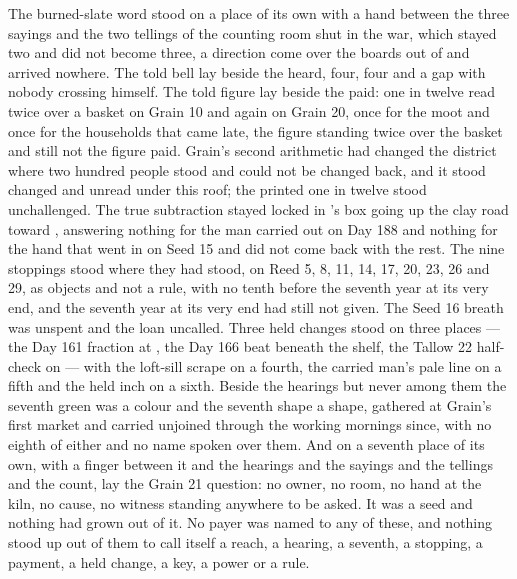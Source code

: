 The burned-slate word stood on a place of its own with a hand between the three sayings and the two tellings of the counting room shut in the war, which stayed two and did not become three, a direction come over the boards out of  and arrived nowhere. The told bell lay beside the heard, four, four and a gap with nobody crossing himself. The told figure lay beside the paid: one in twelve read twice over a basket on Grain 10 and again on Grain 20, once for the moot and once for the households that came late, the figure standing twice over the basket and still not the figure paid. Grain's second arithmetic had changed the district where two hundred people stood and could not be changed back, and it stood changed and unread under this roof; the printed one in twelve stood unchallenged. The true subtraction stayed locked in 's box going up the clay road toward , answering nothing for the man carried out on Day 188 and nothing for the hand that went in on Seed 15 and did not come back with the rest. The nine stoppings stood where they had stood, on Reed 5, 8, 11, 14, 17, 20, 23, 26 and 29, as objects and not a rule, with no tenth before the seventh year at its very end, and the seventh year at its very end had still not given. The Seed 16 breath was unspent and the loan uncalled. Three held changes stood on three places --- the Day 161 fraction at , the Day 166 beat beneath the shelf, the Tallow 22 half-check on  --- with the loft-sill scrape on a fourth, the carried man's pale line on a fifth and the held inch on a sixth. Beside the hearings but never among them the seventh green was a colour and the seventh shape a shape, gathered at Grain's first market and carried unjoined through the working mornings since, with no eighth of either and no name spoken over them. And on a seventh place of its own, with a finger between it and the hearings and the sayings and the tellings and the count, lay the Grain 21 question: no owner, no room, no hand at the kiln, no cause, no witness standing anywhere to be asked. It was a seed and nothing had grown out of it. No payer was named to any of these, and nothing stood up out of them to call itself a reach, a hearing, a seventh, a stopping, a payment, a held change, a key, a power or a rule.

\scenebreak

